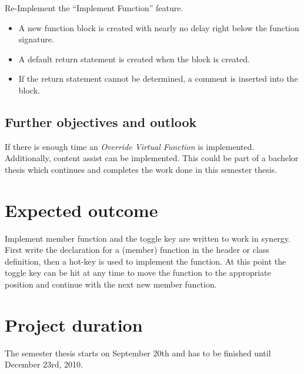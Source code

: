Re-Implement the ``Implement Function'' feature.
\begin{itemize}
 \item A new function block is created with nearly no delay right below the
function signature.
 \item A default return statement is created when the block is created.
 \item If the return statement cannot be determined, a comment is inserted into
the block.
\end{itemize}

\subsection{Further objectives and outlook}

If there is enough time an \textit{Override Virtual Function} is implemented.
Additionally, content assist can be implemented. This could be part of a
bachelor thesis which continues and completes the work done in this semester
thesis.

\section{Expected outcome}

Implement member function and the toggle key are written to work in synergy.
First write the declaration for a (member) function in the header or class
definition, then a hot-key is used to implement the function. At this point the
toggle key can be hit at any time to move the function to the appropriate
position and continue with the next new member function.

\section{Project duration}
The semester thesis starts on September 20th and has to be finished until
December 23rd, 2010.


